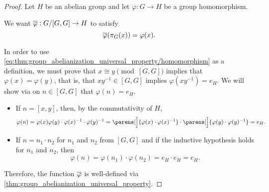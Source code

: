 \begin{proof}
  Let \( H \) be an abelian group and let \( \varphi: G \to H \) be a group homomorphism.

  We want \( \oline{\varphi}: G / [G, G] \to H \) to satisfy
  \begin{equation}\label{eq:thm:group_abelianization_universal_property/homomorphism}
    \oline{\varphi}(\pi_G(x)) = \varphi(x).
  \end{equation}

  In order to use \eqref{eq:thm:group_abelianization_universal_property/homomorphism} as a definition, we must prove that \( x \cong y \pmod {[G, G]} \) implies that \( \varphi(x) = \varphi(y) \), that is, that \( xy^{-1} \in [G, G] \) implies \( \varphi(xy^{-1}) = e_H \). We will show via  on \( n \in [G, G] \) that \( \varphi(n) = e_H \).
  \begin{itemize}
    \item If \( n = [x, y] \), then, by the commutativity of \( H \),
    \begin{equation*}
      \varphi(n)
      =
      \varphi(x) \varphi(y) \cdot \varphi(x)^{-1} \cdot \varphi(y)^{-1}
      =
      \parens[\Big]{ \varphi(x) \cdot \varphi(x)^{-1} } \cdot \parens[\Big]{ \varphi(y) \cdot \varphi(y)^{-1} }
      =
      e_H.
    \end{equation*}

    \item If \( n = n_1 \cdot n_2 \) for \( n_1 \) and \( n_2 \) from \( [G, G] \) and if the inductive hypothesis holds for \( n_1 \) and \( n_2 \), then
    \begin{equation*}
      \varphi(n)
      =
      \varphi(n_1) \cdot \varphi(n_2)
      =
      e_H \cdot e_H
      =
      e_H.
    \end{equation*}
  \end{itemize}

  Therefore, the function \( \oline{\varphi} \) is well-defined via \eqref{thm:group_abelianization_universal_property}.
\end{proof}
